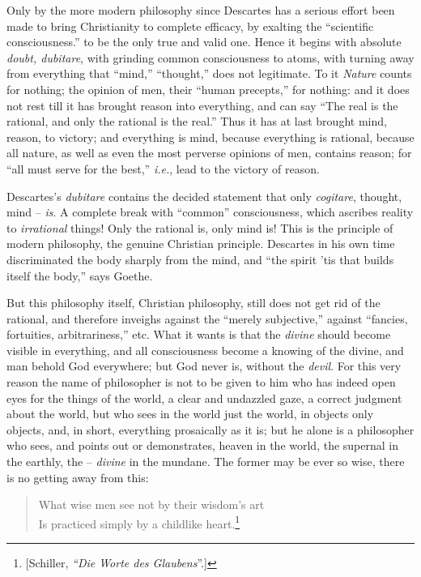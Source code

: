 \documentclass[12pt,a4paper]{book}
\begin{document}
Only by the more modern philosophy since Descartes has a serious effort been 
made to bring Christianity to complete efficacy, by exalting the ``scientific 
consciousness.'' to be the only true and valid one. Hence it begins with 
absolute \textit{doubt, dubitare}, with grinding common consciousness to 
atoms, with turning away from everything that ``mind,'' ``thought,'' does 
not legitimate. To it \textit{Nature} counts for nothing; the opinion of men, 
their ``human precepts,'' for nothing: and it does not rest till it has 
brought reason into everything, and can say ``The real is the rational, and 
only the rational is the real.'' Thus it has at last brought mind, reason, to 
victory; and everything is mind, because everything is rational, because all 
nature, as well as even the most perverse opinions of men, contains reason; 
for ``all must serve for the best,'' \textit{i.e.}, lead to the victory of 
reason.

Descartes's \textit{dubitare} contains the decided statement that only 
\textit{cogitare}, thought, mind -- \textit{is}. A complete break with 
``common'' consciousness, which ascribes reality to \textit{irrational} 
things! Only the rational is, only mind is! This is the principle of modern 
philosophy, the genuine Christian principle. Descartes in his own time 
discriminated the body sharply from the mind, and ``the spirit 'tis that 
builds itself the body,'' says Goethe.

But this philosophy itself, Christian philosophy, still does not get rid of 
the rational, and therefore inveighs against the ``merely subjective,'' 
against ``fancies, fortuities, arbitrariness,'' etc. What it wants is that 
the \textit{divine} should become visible in everything, and all consciousness 
become a knowing of the divine, and man behold God everywhere; but God never 
is, without the \textit{devil}. For this very reason the name of philosopher 
is not to be given to him who has indeed open eyes for the things of the 
world, a clear and undazzled gaze, a correct judgment about the world, but who 
sees in the world just the world, in objects only objects, and, in short, 
everything prosaically as it is; but he alone is a philosopher who sees, and 
points out or demonstrates, heaven in the world, the supernal in the earthly, 
the -- \textit{divine} in the mundane. The former may be ever so wise, there 
is no getting away from this:

\begin{quotation}

\noindent{}What wise men see not by their wisdom's art\\
 Is practiced simply by a childlike heart.\footnote{[Schiller, \textit{``Die 
Worte des Glaubens}''.]}\end{quotation}
\end{document}
